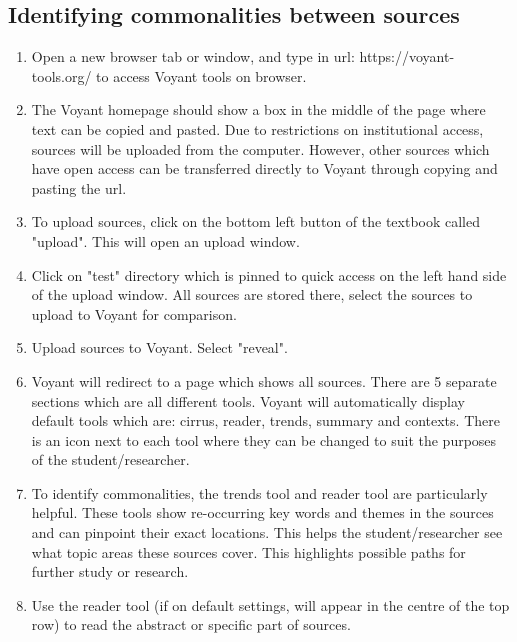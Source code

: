 \documentclass{article}
\begin{document}
\subsection{Identifying commonalities between sources}
\begin{enumerate}
    \item Open a new browser tab or window, and type in url: https://voyant-tools.org/ to access Voyant tools on browser.
    \item The Voyant homepage should show a box in the middle of the page where text can be copied and pasted. Due to restrictions on institutional access, sources will be uploaded from the computer. However, other sources which have open access can be transferred directly to Voyant through copying and pasting the url.
    \item To upload sources, click on the bottom left button of the textbook called "upload". This will open an upload window.
    \item Click on "test" directory which is pinned to quick access on the left hand side of the upload window. All sources are stored there, select the sources to upload to Voyant for comparison.
    \item Upload sources to Voyant. Select "reveal".
    \item Voyant will redirect to a page which shows all sources. There are 5 separate sections which are all different tools. Voyant will automatically display default tools which are: cirrus, reader, trends, summary and contexts. There is an icon next to each tool where they can be changed to suit the purposes of the student/researcher.
    \item To identify commonalities, the trends tool and reader tool are particularly helpful. These tools show re-occurring key words and themes in the sources and can pinpoint their exact locations. This helps the student/researcher see what topic areas these sources cover. This highlights possible paths for further study or research.
    \item Use the reader tool (if on default settings, will appear in the centre of the top row) to read the abstract or specific part of sources.
\end{enumerate}
\end{document}
